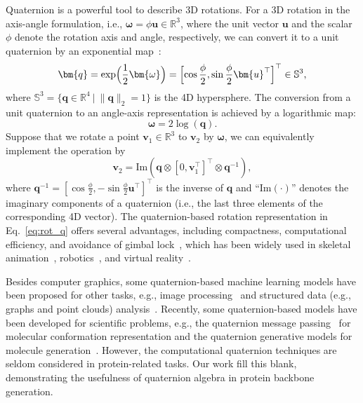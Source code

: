 Quaternion is a powerful tool to describe 3D rotations. 
For a 3D rotation in the axis-angle formulation, i.e., $\bm{\omega} = \phi \bm{u} \in \mathbb{R}^3$, where the unit vector $\bm{u}$ and the scalar $\phi$ denote the rotation axis and angle, respectively, we can convert it to a unit quaternion by an exponential map~\cite{sola2017quaternion}:
\begin{equation}\label{eq:exp_map}
    \bm{q} = \exp\Bigl(\frac{1}{2} \bm{\omega}\Bigr) = \Bigl[\cos\frac{\phi}{2}, \sin\frac{\phi}{2}\bm{u}^\top\Bigr]^\top\in\mathbb{S}^3,
\end{equation}
where $\mathbb{S}^3=\{\bm{q}\in\mathbb{R}^4~|~\|\bm{q}\|_2=1\}$ is the 4D hypersphere.
The conversion from a unit quaternion to an angle-axis representation is achieved by a logarithmic map:
\begin{equation}\label{eq:log_map}
    \bm{\omega} = 2\log(\bm{q}).
\end{equation}
Suppose that we rotate a point $\bm{v}_1\in\mathbb{R}^3$ to $\bm{v}_2$ by $\bm{\omega}$, we can equivalently implement the operation by
\begin{equation}\label{eq:rot_q}
    \bm{v}_2 = \text{Im}(\bm{q} \otimes [0, \bm{v}_1^\top]^\top \otimes \bm{q}^{-1}),
\end{equation}
where $\bm{q}^{-1}=[\cos\frac{\phi}{2}, -\sin\frac{\phi}{2}\bm{u}^\top]^{\top}$ is the inverse of $\bm{q}$ and ``$\text{Im}(\cdot)$'' denotes the imaginary components of a quaternion (i.e., the last three elements of the corresponding 4D vector).
The quaternion-based rotation representation in Eq.~\ref{eq:rot_q} offers several advantages, including compactness, computational efficiency, and avoidance of gimbal lock~\cite{hemingway2018perspectives}, which has been widely used in skeletal animation~\cite{shoemake1985animating}, robotics~\cite{pervin1982quaternions}, and virtual reality~\cite{kuipers1999quaternions}.

Besides computer graphics, some quaternion-based machine learning models have been proposed for other tasks, e.g., image processing~\cite{xu2015vector,zhu2018quaternion} and structured data (e.g., graphs and point clouds) analysis~\cite{zhang2020quaternion,zhao2020quaternion}.
Recently, some quaternion-based models have been developed for scientific problems, e.g., the quaternion message passing~\cite{yue2024plug} for molecular conformation representation and the quaternion generative models for molecule generation~\cite{kohler2023rigid,guo2025assembleflow}.
However, the computational quaternion techniques are seldom considered in protein-related tasks.
Our work fill this blank, demonstrating the usefulness of quaternion algebra in protein backbone generation.

